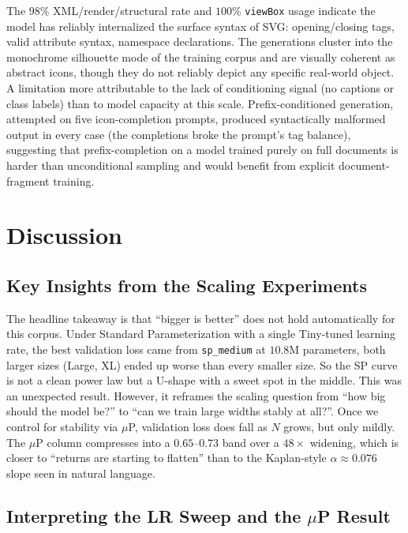 \documentclass[a4paper]{article}
\begin{document}
The $98\%$ XML/render/structural rate and $100\%$ \texttt{viewBox} usage indicate the model has reliably internalized the surface syntax of SVG: opening/closing tags, valid attribute syntax, namespace declarations. The generations cluster into the monochrome silhouette mode of the training corpus and are visually coherent as abstract icons, though they do not reliably depict any specific real-world object. A limitation more attributable to the lack of conditioning signal (no captions or class labels) than to model capacity at this scale. Prefix-conditioned generation, attempted on five icon-completion prompts, produced syntactically malformed output in every case (the completions broke the prompt's tag balance), suggesting that prefix-completion on a model trained purely on full documents is harder than unconditional sampling and would benefit from explicit document-fragment training.

\section{Discussion}


\subsection{Key Insights from the Scaling Experiments}

The headline takeaway is that ``bigger is better'' does not hold automatically for this corpus. Under Standard Parameterization with a single Tiny-tuned learning rate, the best validation loss came from \texttt{sp\_medium} at $10.8$M parameters, both larger sizes (Large, XL) ended up worse than every smaller size. So the SP curve is not a clean power law but a U-shape with a sweet spot in the middle. This was an unexpected result. However, it reframes the scaling question from ``how big should the model be?'' to ``can we train large widths stably at all?''. Once we control for stability via $\mu$P, validation loss does fall as $N$ grows, but only mildly. The $\mu$P column compresses into a $0.65$--$0.73$ band over a $48\times$ widening, which is closer to ``returns are starting to flatten'' than to the Kaplan-style $\alpha \approx 0.076$ slope seen in natural language.

\subsection{Interpreting the LR Sweep and the $\mu$P Result}
\end{document}
